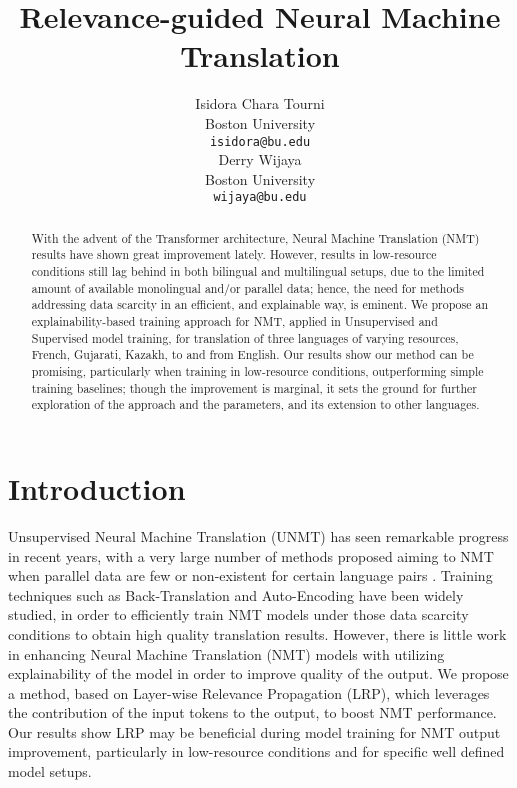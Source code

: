 \documentclass[11pt]{article}
\title{Relevance-guided Neural Machine Translation}
\author{Isidora Chara Tourni \\
  Boston University\\
  \texttt{isidora@bu.edu} \\
  \And
  Derry Wijaya \\
  Boston University \\
  \texttt{wijaya@bu.edu}}
\begin{document}
\maketitle
\begin{abstract}
With the advent of the Transformer architecture, Neural Machine Translation (NMT) results have shown great improvement lately. 
However, results in low-resource conditions still lag behind in both bilingual and multilingual setups, due to the limited amount of available monolingual and/or parallel data; hence, the need for methods addressing data scarcity in an efficient, and explainable way, is eminent. We propose an explainability-based training approach for NMT, applied in Unsupervised and Supervised model training, for translation of three languages of varying resources, French, Gujarati, Kazakh, to and from English. Our results show our method can be promising, particularly when training in low-resource conditions, outperforming simple training baselines;  though the improvement is marginal, it sets the ground for further exploration of the approach and the parameters, and its extension to other languages. 
\end{abstract}

\section{Introduction}
Unsupervised Neural Machine Translation (UNMT) has seen remarkable progress in recent years, with a very large number of methods proposed aiming to NMT when parallel data are few or non-existent for certain language pairs \citep{artetxe2017unsupervised, lample2018phrase, conneau2017word, wang2021advances,lample2019cross,song2019mass,liu2020multilingual,
marchisio2020does,kim2020and,lample2017unsupervised,artetxe2019effective,garcia2020multilingual,su2019unsupervised, nguyen2022refining}.
Training techniques such as Back-Translation \citep{sennrich2015improving} and Auto-Encoding have been widely studied, in order to efficiently train NMT models under those data scarcity conditions to obtain high quality translation results. However, there is little work in enhancing Neural Machine Translation (NMT) models with utilizing explainability of the model in order to improve quality of the output. We propose a method, based on Layer-wise Relevance Propagation (LRP), which leverages the contribution of the input tokens to the output, to boost NMT performance. Our results show LRP may be beneficial during model training for NMT output improvement, particularly in low-resource conditions and for specific well defined model setups.
\end{document}
